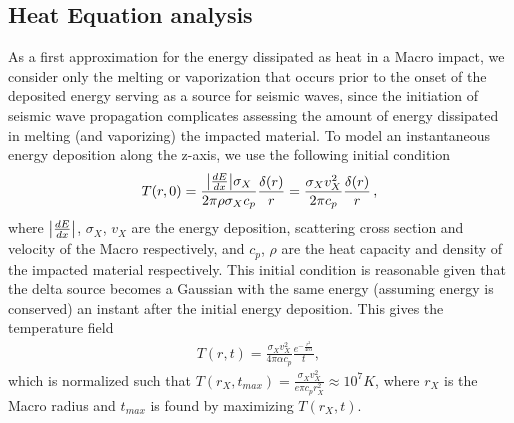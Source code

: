 \documentclass[prd,reprint,10pt]{revtex4-1}
\newcommand*\f[2]{\frac{#1}{#2}}
\begin{document}
\subsection{Heat Equation analysis}
As a first approximation for the energy dissipated as heat in a Macro impact, we consider only the melting or vaporization that occurs prior to the onset of the deposited energy serving as a source for seismic waves, since the initiation of seismic wave propagation complicates assessing the amount of energy dissipated in melting (and vaporizing) the impacted material.  To model an instantaneous energy deposition along the z-axis, we use the following initial condition
\begin{align}
T(r,0) = \f{\abs{\frac{dE}{dx}}\sigma_X}{2\pi \rho \sigma_X c_p}\f{\delta(r)}{r} = \f{\sigma_{X} v_X^2}{2\pi c_p}\f{\delta(r)}{r}\,,
\end{align}
where $\abs{\frac{dE}{dx}}$, $\sigma_{X}$, $v_X$ are the energy deposition, scattering cross section and velocity of the Macro respectively, and $c_p$, $\rho$ are the heat capacity and density of the impacted material respectively. This initial condition is reasonable given that the delta source becomes a Gaussian with the same energy (assuming energy is conserved) an instant after the initial energy deposition.
This gives the temperature field
\begin{align}
T(r,t) = \f{\sigma_{X} v_X^2}{4\pi \alpha c_p}\f{e^{-\f{r^2}{4t\alpha}}}{t},\,
\end{align} which is normalized such that $T(r_X,t_{max}) = \frac{\sigma_X v_X^2}{e \pi  c_p r_X^2} \approx 10^7 K$, where $r_X$ is the Macro radius and $t_{max}$ is found by maximizing $T(r_X,t)$. 
\end{document}
